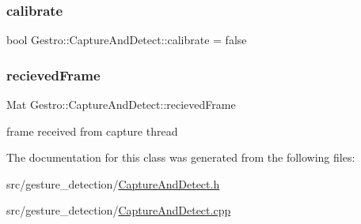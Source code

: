 \subsubsection{\texorpdfstring{calibrate}{calibrate}}
{\footnotesize\ttfamily bool Gestro\+::\+Capture\+And\+Detect\+::calibrate = false}

\mbox{\label{classGestro_1_1CaptureAndDetect_a5bd3dee8a4b9bffe627b1475a84da4e8}} 
\subsubsection{\texorpdfstring{recieved\+Frame}{recievedFrame}}
{\footnotesize\ttfamily Mat Gestro\+::\+Capture\+And\+Detect\+::recieved\+Frame}



frame received from capture thread 



The documentation for this class was generated from the following files\+:\begin{DoxyCompactItemize}
\item 
src/gesture\+\_\+detection/\hyperlink{CaptureAndDetect_8h}{Capture\+And\+Detect.\+h}\item 
src/gesture\+\_\+detection/\hyperlink{CaptureAndDetect_8cpp}{Capture\+And\+Detect.\+cpp}\end{DoxyCompactItemize}
